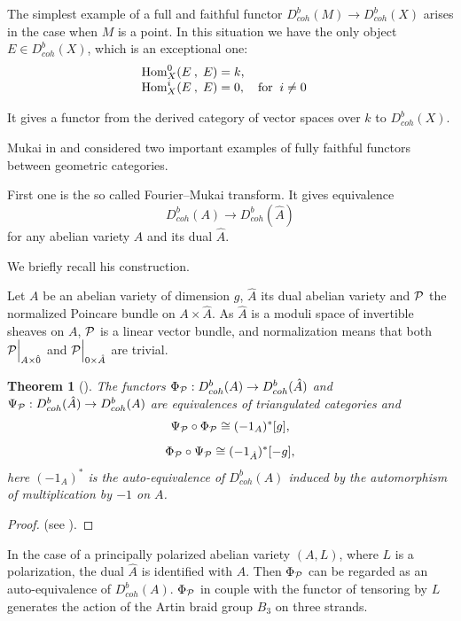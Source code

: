 \documentclass[12pt]{article}
\newtheorem{theorem}{Theorem}[section]
\def\db#1{ D^b_{coh}({#1})}
\def\H#1,#2,#3,#4{{\rm Hom}^{#1}_{#2}({#3}\:,\; {#4})}
\def\lto{\longrightarrow}
\begin{document}
\bigskip


The simplest example of a full and faithful functor $\db{M}\lto\db{X}$ arises in the case when $M$ is a point. In this situation we have the only {\sf object} $E\in \db{X}$, which is an {\sf exceptional} one:
$$
\begin{array}{ll}
{\H 0, X, E, E}=k, &\\
{\H i, X, E, E}=0, \quad\mbox{for }\: i\ne 0
\end{array}
$$

It gives a functor from the derived category of vector spaces over $k$ to $\db{X}$.




Mukai in \cite{Mu} and \cite{Mu2} considered two important examples of fully faithful functors between geometric categories.

First one is the so called Fourier--Mukai transform. It gives equivalence
$$
\db{A}\lto\db{\hat A}
$$
for any abelian variety $A$ and its dual $\hat A$.

We briefly recall his construction.

Let $A$ be an abelian variety of dimension $g$, $\hat A$ its dual abelian variety and ${\cal P}$ the normalized Poincare bundle on $A\times\hat A$. As $\hat A$ is a moduli space of invertible sheaves on $A$, ${\cal P}$ is a linear vector bundle, and normalization means that both ${\cal P}\Bigl|_{A\times\hat 0}$ and ${\cal P}\Bigl|_{0\times\hat A}$ are trivial.
\begin{theorem}[\cite{Mu}]\label{ab}
The functors $\Phi_{\cal P}:\db{A}\to \db{\hat A}$ and $\Psi_{\cal P}:\db{\hat A}\to \db{A}$ are equivalences of triangulated categories and
$$
\Psi_{\cal P}\circ\Phi_{\cal P}\cong (-1_A)^*[g],
$$
$$
\Phi_{\cal P}\circ\Psi_{\cal P}\cong (-1_{\hat A})^*[-g],
$$
here $(-1_A)^*$ is the auto-equivalence of $\db{A}$ induced by the automorphism of multiplication by $-1$ on $A$.
\end{theorem}
\begin{proof}(see \cite{Mu}).\end{proof}

In the case of a principally polarized abelian variety $(A, L)$, where $L$ is a polarization, the dual $\hat A$ is identified with $A$. Then $\Phi_{\cal P}$ can be regarded as an auto-equivalence of $\db{A}$. $\Phi_{\cal P}$ in couple
with the functor of tensoring by $L$ generates the action of 
the Artin braid group $B_3$ on three strands.
\end{document}
